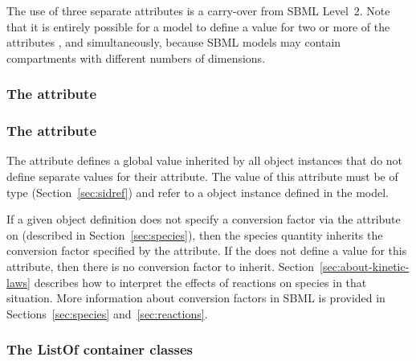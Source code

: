 The use of three separate attributes is a carry-over from SBML
Level~2.  Note that it is entirely possible for a model to define
a value for two or more of the attributes ,
 and  simultaneously, because
SBML models may contain compartments with different numbers of
dimensions.


\subsubsection{The  attribute}
\label{sec:model-extentUnits}


\subsubsection{The  attribute}
\label{sec:model-conversionFactor}

The attribute  defines a global value
inherited by all \Species object instances that do not define
separate values for their  attribute.  The
value of this attribute must be of type 
(Section~\ref{sec:sidref}) and refer to a \Parameter object
instance defined in the model.

If a given \Species object definition does not specify a
conversion factor via the  attribute on
\Species (described in Section~\ref{sec:species}), then the
species quantity inherits the conversion factor specified by the
\Model {} attribute.  If the \Model does not
define a value for this attribute, then there is no conversion
factor to inherit.  Section~\ref{sec:about-kinetic-laws} describes
how to interpret the effects of reactions on species in that
situation.  More information about conversion factors in SBML is
provided in Sections~\ref{sec:species} and~\ref{sec:reactions}.


\subsubsection{The ListOf container classes}
\label{sec:listof}
\label{sec:listofunitdefinitions}
\label{sec:listoffunctiondefinitions}
\label{sec:listofcompartments}
\label{sec:listofspecies}
\label{sec:listofparameters}
\label{sec:listofinitialassignments}
\label{sec:listofinitialassign}
\label{sec:listofrules}
\label{sec:listofconstraints}
\label{sec:listofreactions}
\label{sec:listofevents}

